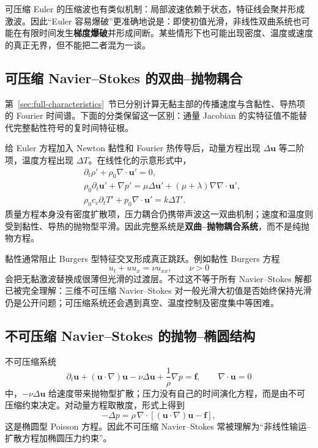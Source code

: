 \documentclass[cn,hazy,blue,11pt,normal]{elegantnote}
\numberwithin{equation}{section}
\newcommand{\vct}[1]{\bm{#1}}
\begin{document}
可压缩 Euler 的压缩波也有类似机制：局部波速依赖于状态，特征线会聚并形成激波。因此“Euler 容易爆破”更准确地说是：即使初值光滑，非线性双曲系统也可能在有限时间发生\textbf{梯度爆破}并形成间断。某些情形下也可能出现密度、温度或速度的真正无界，但不能把二者混为一谈。

\subsection{可压缩 Navier--Stokes 的双曲--抛物耦合}

第~\ref{sec:full-characteristics}~节已分别计算无黏主部的传播速度与含黏性、导热项的 Fourier 时间谱。下面的分类保留这一区别：通量 Jacobian 的实特征值不能替代完整黏性符号的复时间特征根。

给 Euler 方程加入 Newton 黏性和 Fourier 热传导后，动量方程出现 $\Delta\vct u$ 等二阶项，温度方程出现 $\Delta T$。在线性化的示意形式中，
\begin{align}
 &\partial_t\rho'+\rho_0\nabla\cdot\vct u'=0,\\
 &\rho_0\partial_t\vct u'+\nabla p'
 =\mu\Delta\vct u'+(\mu+\lambda)\nabla\nabla\cdot\vct u',\\
 &\rho_0c_v\partial_tT'+p_0\nabla\cdot\vct u'=k\Delta T'.
\end{align}
质量方程本身没有密度扩散项，压力耦合仍携带声波这一双曲机制；速度和温度则受到黏性、导热的抛物型平滑。因此完整系统是\textbf{双曲--抛物耦合系统}，而不是纯抛物方程。

黏性通常阻止 Burgers 型特征交叉形成真正跳跃。例如黏性 Burgers 方程
\begin{equation}
 u_t+uu_x=\nu u_{xx},\qquad \nu>0
\end{equation}
会把无黏激波替换成很薄但光滑的过渡层。不过这不等于所有 Navier--Stokes 解都已被完全理解：三维不可压缩 Navier--Stokes 对一般光滑大初值是否始终保持光滑仍是公开问题；可压缩系统还会遇到真空、温度控制及密度集中等困难。

\subsection{不可压缩 Navier--Stokes 的抛物--椭圆结构}

不可压缩系统
\begin{equation}
 \partial_t\vct u+(\vct u\cdot\nabla)\vct u
 -\nu\Delta\vct u+\frac1\rho\nabla p=\vct f,
 \qquad \nabla\cdot\vct u=0
\end{equation}
中，$-\nu\Delta\vct u$ 给速度带来抛物型扩散；压力没有自己的时间演化方程，而是由不可压缩约束决定。对动量方程取散度，形式上得到
\begin{equation}
 -\Delta p
 =\rho\,\nabla\cdot[(\vct u\cdot\nabla)\vct u-\vct f],
\end{equation}
这是椭圆型 Poisson 方程。因此不可压缩 Navier--Stokes 常被理解为“非线性输运--扩散方程加椭圆压力约束”。
\end{document}
